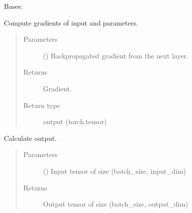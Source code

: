 \documentclass[letterpaper,10pt,english]{sphinxmanual}
\begin{document}
\begin{fulllineitems}
\label{\detokenize{nn:nn.linear.Linear}}
Bases: {\hyperref[\detokenize{nn:nn.linear.Layer}]{}}

\begin{fulllineitems}
\label{\detokenize{nn:nn.linear.Linear.backward}}
Compute gradients of input and parameters.
\begin{quote}\begin{description}
\item[{Parameters}] \leavevmode
{} () \textendash{} Backpropagated gradient from the next layer.

\item[{Returns}] \leavevmode
Gradient.

\item[{Return type}] \leavevmode
output (torch.tensor)

\end{description}\end{quote}

\end{fulllineitems}


\begin{fulllineitems}
\label{\detokenize{nn:nn.linear.Linear.forward}}
Calculate output.
\begin{quote}\begin{description}
\item[{Parameters}] \leavevmode
{} () \textendash{} Input tensor of size (batch\_size, input\_dim)

\item[{Returns}] \leavevmode
Output tensor of size (batch\_size, output\_dim)


\end{description}
\end{quote}
\end{fulllineitems}
\end{fulllineitems}
\end{document}
